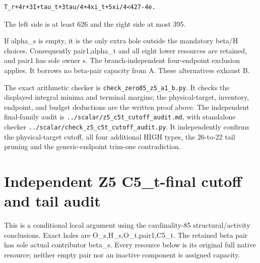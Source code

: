 \documentclass[10pt,a4paper]{article}
\theoremstyle{definition}
\begin{document}
\begin{lstlisting}
T_r+4r+3I+tau_t+3tau/4+4xi_t+5xi/4<427-4e.
\end{lstlisting}

The left side is at least 626 and the right side at most 395.

If alpha\_\allowbreak{}s is empty,\allowbreak{} it is the only extra hole outside the mandatory
beta/H choices. Consequently pair1,\allowbreak{}alpha\_\allowbreak{}t and all eight lower
resources are retained,\allowbreak{} and pair1 has sole owner s. The
branch-independent four-endpoint exclusion applies. It borrows no
beta-pair capacity from A. These alternatives exhaust B.

The exact arithmetic checker is
\texttt{check\_\allowbreak{}\allowbreak{}zero85\_\allowbreak{}\allowbreak{}z5\_\allowbreak{}\allowbreak{}a1\_\allowbreak{}\allowbreak{}b.py}. It checks the
displayed integral minima and terminal margins; the physical-target,\allowbreak{}
inventory,\allowbreak{} endpoint,\allowbreak{} and budget deductions are the written proof above.
The independent final-family audit is
\texttt{../\allowbreak{}scalar/\allowbreak{}z5\_\allowbreak{}\allowbreak{}c5t\_\allowbreak{}\allowbreak{}cutoff\_\allowbreak{}\allowbreak{}audit.md},\allowbreak{} with
standalone checker
\texttt{../\allowbreak{}scalar/\allowbreak{}check\_\allowbreak{}\allowbreak{}z5\_\allowbreak{}\allowbreak{}c5t\_\allowbreak{}\allowbreak{}cutoff\_\allowbreak{}\allowbreak{}audit.py}. It
independently confirms the physical-target cutoff,\allowbreak{} all four additional
HIGH types,\allowbreak{} the 26-to-22 tail pruning and the generic-endpoint trim-one
contradiction.

\clearpage
\hypertarget{independent-z5-c5_t-final-cutoff-and-tail-audit}{%
\section{Independent Z5 C5\_\allowbreak{}t-final cutoff and tail
audit}\label{independent-z5-c5_t-final-cutoff-and-tail-audit}}

This is a conditional local argument using the cardinality-85
structural/activity conclusions. Exact holes are
O\_\allowbreak{}s,\allowbreak{}H\_\allowbreak{}s,\allowbreak{}O\_\allowbreak{}t,\allowbreak{}pair1,\allowbreak{}C5\_\allowbreak{}t. The retained beta pair has sole actual
contributor beta\_\allowbreak{}s. Every resource below is its original full native
resource; neither empty pair nor an inactive component is assigned
capacity.
\end{document}
